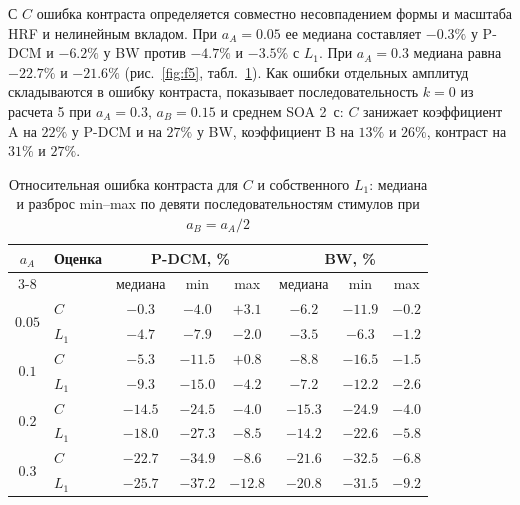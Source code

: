 С $C$ ошибка контраста определяется совместно несовпадением формы и масштаба HRF и нелинейным вкладом. При $a_A=0.05$ ее медиана составляет $-0.3\%$ у P-DCM и $-6.2\%$ у BW против $-4.7\%$ и $-3.5\%$ с $L_1$. При $a_A=0.3$ медиана равна $-22.7\%$ и $-21.6\%$ (рис.~\ref{fig:f5}, табл.~\ref{tab:amp}). Как ошибки отдельных амплитуд складываются в ошибку контраста, показывает последовательность $k=0$ из расчета 5 при $a_A=0.3$, $a_B=0.15$ и среднем SOA 2~с: $C$ занижает коэффициент A на $22\%$ у P-DCM и на $27\%$ у BW, коэффициент B на $13\%$ и $26\%$, контраст на $31\%$ и $27\%$.

\begin{table}[!ht]
\captionsetup{justification=raggedright}
\caption{Относительная ошибка контраста для $C$ и собственного $L_1$: медиана и разброс min--max по девяти последовательностям стимулов при $a_B=a_A/2$}
\label{tab:amp}
\centering
\footnotesize
\setlength{\tabcolsep}{4pt}
\begin{tabular}{clcccccc}
\hline
\multirow{2}{*}{$a_A$} & \multirow{2}{*}{Оценка} & \multicolumn{3}{c}{P-DCM, \%} & \multicolumn{3}{c}{BW, \%}\\
\cline{3-8}
 & & медиана & min & max & медиана & min & max\\
\hline
\multirow{2}{*}{$0.05$} & $C$ & $-0.3$ & $-4.0$ & $+3.1$ & $-6.2$ & $-11.9$ & $-0.2$\\
 & $L_1$ & $-4.7$ & $-7.9$ & $-2.0$ & $-3.5$ & $-6.3$ & $-1.2$\\
\hline
\multirow{2}{*}{$0.1$} & $C$ & $-5.3$ & $-11.5$ & $+0.8$ & $-8.8$ & $-16.5$ & $-1.5$\\
 & $L_1$ & $-9.3$ & $-15.0$ & $-4.2$ & $-7.2$ & $-12.2$ & $-2.6$\\
\hline
\multirow{2}{*}{$0.2$} & $C$ & $-14.5$ & $-24.5$ & $-4.0$ & $-15.3$ & $-24.9$ & $-4.0$\\
 & $L_1$ & $-18.0$ & $-27.3$ & $-8.5$ & $-14.2$ & $-22.6$ & $-5.8$\\
\hline
\multirow{2}{*}{$0.3$} & $C$ & $-22.7$ & $-34.9$ & $-8.6$ & $-21.6$ & $-32.5$ & $-6.8$\\
 & $L_1$ & $-25.7$ & $-37.2$ & $-12.8$ & $-20.8$ & $-31.5$ & $-9.2$\\
\hline
\end{tabular}
\end{table}

